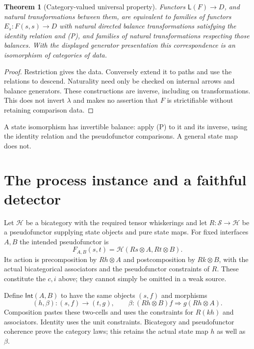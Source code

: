 \documentclass[11pt]{article}
\newtheorem{theorem}{Theorem}\newtheorem{proposition}{Proposition}
\begin{document}
\begin{theorem}[Category-valued universal property]
Functors $\mathsf L(F)\to D$, and natural transformations between them, are equivalent to families of functors $E_s:F(s,s)\to D$ with natural directed balance transformations satisfying the identity relation and (P), and families of natural transformations respecting those balances. With the displayed generator presentation this correspondence is an isomorphism of categories of data.
\end{theorem}
\begin{proof}
Restriction gives the data. Conversely extend it to paths and use the relations to descend. Naturality need only be checked on internal arrows and balance generators. These constructions are inverse, including on transformations. This does not invert $\lambda$ and makes no assertion that $F$ is strictifiable without retaining comparison data.
\end{proof}
A state isomorphism has invertible balance: apply (P) to it and its inverse, using the identity relation and the pseudofunctor comparisons. A general state map does not.

\section{The process instance and a faithful detector}
Let $\mathcal H$ be a bicategory with the required tensor whiskerings and let $R:\mathcal S\to\mathcal H$ be a pseudofunctor supplying state objects and pure state maps. For fixed interfaces $A,B$ the intended pseudofunctor is
\[
 F_{A,B}(s,t)=\mathcal H(Rs\otimes A,Rt\otimes B).
\]
Its action is precomposition by $Rh\otimes A$ and postcomposition by $Rk\otimes B$, with the actual bicategorical associators and the pseudofunctor constraints of $R$. These constitute the $c,i$ above; they cannot simply be omitted in a weak source.

Define $\mathsf{Int}(A,B)$ to have the same objects $(s,f)$ and morphisms
\[
 (h,\beta):(s,f)\longrightarrow(t,g),\qquad
 \beta:(Rh\otimes B)f\Rightarrow g(Rh\otimes A).
 \tag{I}
\]
Composition pastes these two-cells and uses the constraints for $R(kh)$ and associators. Identity uses the unit constraints. Bicategory and pseudofunctor coherence prove the category laws; this retains the actual state map $h$ as well as $\beta$.
\end{document}
